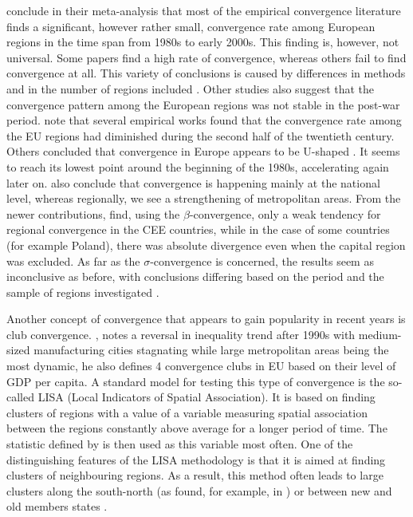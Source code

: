 \documentclass[11pt]{article}
\begin{document}
\citet{eckey2007convergence} conclude in their meta-analysis that most of the empirical convergence literature finds a significant, however rather small, convergence rate among European regions in the time span from 1980s to early 2000s. This finding is, however, not universal. Some papers find a high rate of convergence, whereas others fail to find convergence at all. This variety of conclusions is caused by differences in methods and in the number of regions included \citep{eckey2007convergence}. Other studies also suggest that the convergence pattern among the European regions was not stable in the post-war period. \citet{eckey2007convergence} note that several empirical works found that the convergence rate among the EU regions had diminished during the second half of the twentieth century. Others concluded that convergence in Europe appears to be U-shaped \citep{basile2001regional, geppert2008regional}. It seems to reach its lowest point around the beginning of the 1980s, accelerating again later on. \citet{geppert2008regional} also conclude that convergence is happening mainly at the national level, whereas regionally, we see a strengthening of metropolitan areas. From the newer contributions, \citet*{sme2012regional} find, using the $\beta$-convergence, only a weak tendency for regional convergence in the CEE countries, while in the case of some countries (for example Poland), there was absolute divergence even when the capital region was excluded. As far as the $\sigma$-convergence is concerned, the results seem as inconclusive as before, with conclusions differing based on the period and the sample of regions investigated \citep{eckey2007convergence}.
 
 Another concept of convergence that appears to gain popularity in recent years is club convergence. \citet{iammarino2017regional}, notes a reversal in inequality trend after 1990s with medium-sized manufacturing cities stagnating while large metropolitan areas being the most dynamic, he also defines 4 convergence clubs in EU based on their level of GDP per capita.  %
 A standard model for testing this type of convergence is the so-called LISA (Local Indicators of Spatial Association). It is based on finding clusters of regions with a value of a variable measuring spatial association between the regions constantly above average for a longer period of time. The statistic defined by \citet{getis1992analysis} is then used as this variable most often. One of the distinguishing features of the LISA methodology is that it is aimed at finding clusters of neighbouring regions. As a result, this method often leads to large clusters along the south-north  (as found, for example, in \citet{baumont2003spatial}) or between new and old members states \citep{eckey2007convergence}.
 
\end{document}
